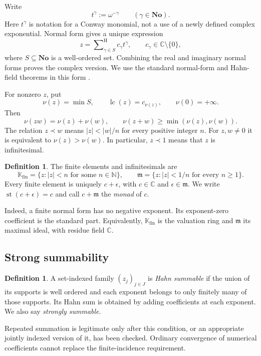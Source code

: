 \documentclass[11pt,oneside]{article}
\theoremstyle{definition}\newtheorem{definition}[theorem]{Definition}
\newcommand{\No}{\mathbf{No}}
\newcommand{\K}{\mathbb K}
\newcommand{\C}{\mathbb C}
\newcommand{\N}{\mathbb N}
\newcommand{\mm}{\mathfrak m}
\newcommand{\st}{\operatorname{st}}
\newcommand{\lc}{\operatorname{lc}}
\newcommand{\Hsum}{\mathop{\sum}\nolimits^{\mathrm H}}
\newcommand{\val}{\nu}
\newcommand{\Fin}{\K_{\mathrm{fin}}}
\begin{document}
Write
\[
 t^\gamma:=\omega^{-\gamma}\qquad(\gamma\in\No).
\]
Here $t^\gamma$ is notation for a Conway monomial, not a use of a newly defined complex exponential. Normal form gives a unique expression
\begin{equation}\label{eq:normal}
 z=\Hsum_{\gamma\in S} c_\gamma t^\gamma,
 \qquad c_\gamma\in\C\setminus\{0\},
\end{equation}
where $S\subseteq\No$ is a well-ordered set. Combining the real and imaginary normal forms proves the complex version. We use the standard normal-form and Hahn-field theorems in this form \cite{Conway,Gonshor,vdDE}.

For nonzero $z$, put
\[
 \val(z)=\min S,\qquad \lc(z)=c_{\val(z)},\qquad \val(0)=+\infty.
\]
Then
\[
 \val(zw)=\val(z)+\val(w),\qquad
 \val(z+w)\geq\min(\val(z),\val(w)).
\]
The relation $z\prec w$ means $|z|<|w|/n$ for every positive integer $n$. For $z,w\ne0$ it is equivalent to $\val(z)>\val(w)$. In particular, $z\prec1$ means that $z$ is infinitesimal.

\begin{definition}
The finite elements and infinitesimals are
\[
 \Fin=\{z:|z|<n\text{ for some }n\in\N\},\qquad
 \mm=\{z:|z|<1/n\text{ for every }n\geq1\}.
\]
Every finite element is uniquely $c+\epsilon$, with $c\in\C$ and $\epsilon\in\mm$. We write $\st(c+\epsilon)=c$ and call $c+\mm$ the \emph{monad} of $c$.
\end{definition}
Indeed, a finite normal form has no negative exponent. Its exponent-zero coefficient is the standard part. Equivalently, $\Fin$ is the valuation ring and $\mm$ its maximal ideal, with residue field $\C$.

\subsection{Strong summability}
\begin{definition}\label{def:sum}
A set-indexed family $(z_j)_{j\in J}$ is \emph{Hahn summable} if the union of its supports is well ordered and each exponent belongs to only finitely many of those supports. Its Hahn sum is obtained by adding coefficients at each exponent. We also say \emph{strongly summable}.
\end{definition}
Repeated summation is legitimate only after this condition, or an appropriate jointly indexed version of it, has been checked. Ordinary convergence of numerical coefficients cannot replace the finite-incidence requirement.
\end{document}
